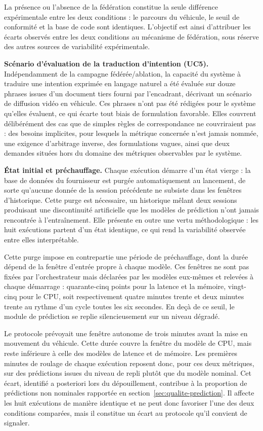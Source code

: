 La présence ou l'absence de la fédération constitue la seule différence expérimentale entre les deux conditions : le parcours du véhicule, le seuil de conformité et la base de code sont identiques. L'objectif est ainsi d'attribuer les écarts observés entre les deux conditions au mécanisme de fédération, sous réserve des autres sources de variabilité expérimentale.

\textbf{Scénario d'évaluation de la traduction d'intention (UC5).} Indépendamment de la campagne fédérée/ablation, la capacité du système à traduire une intention exprimée en langage naturel a été évaluée sur douze phrases issues d'un document tiers fourni par l'encadrant, décrivant un scénario de diffusion vidéo en véhicule. Ces phrases n'ont pas été rédigées pour le système qu'elles évaluent, ce qui écarte tout biais de formulation favorable. Elles couvrent délibérément des cas que de simples règles de correspondance ne couvriraient pas : des besoins implicites, pour lesquels la métrique concernée n'est jamais nommée, une exigence d'arbitrage inverse, des formulations vagues, ainsi que deux demandes situées hors du domaine des métriques observables par le système.

\textbf{État initial et préchauffage.} Chaque exécution démarre d'un état vierge : la base de données du fournisseur est purgée automatiquement au lancement, de sorte qu'aucune donnée de la session précédente ne subsiste dans les fenêtres d'historique. Cette purge est nécessaire, un historique mêlant deux sessions produisant une discontinuité artificielle que les modèles de prédiction n'ont jamais rencontrée à l'entraînement. Elle présente en outre une vertu méthodologique : les huit exécutions partent d'un état identique, ce qui rend la variabilité observée entre elles interprétable.

Cette purge impose en contrepartie une période de préchauffage, dont la durée dépend de la fenêtre d'entrée propre à chaque modèle. Ces fenêtres ne sont pas fixées par l'orchestrateur mais déclarées par les modèles eux-mêmes et relevées à chaque démarrage : quarante-cinq points pour la latence et la mémoire, vingt-cinq pour le CPU, soit respectivement quatre minutes trente et deux minutes trente au rythme d'un cycle toutes les six secondes. En deçà de ce seuil, le module de prédiction se replie silencieusement sur un niveau dégradé.

Le protocole prévoyait une fenêtre autonome de trois minutes avant la mise en mouvement du véhicule. Cette durée couvre la fenêtre du modèle de CPU, mais reste inférieure à celle des modèles de latence et de mémoire. Les premières minutes de roulage de chaque exécution reposent donc, pour ces deux métriques, sur des prédictions issues du niveau de repli plutôt que du modèle nominal. Cet écart, identifié a posteriori lors du dépouillement, contribue à la proportion de prédictions non nominales rapportée en section~\ref{sec:qualite-prediction}. Il affecte les huit exécutions de manière identique et ne peut donc favoriser l'une des deux conditions comparées, mais il constitue un écart au protocole qu'il convient de signaler.


